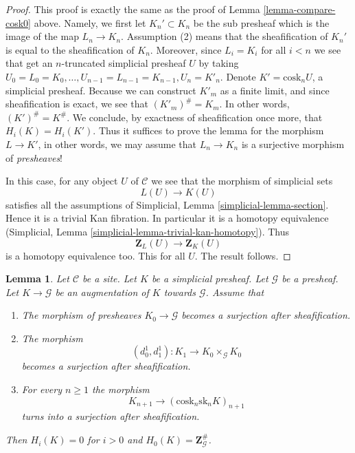 \documentclass{stacks-project}
\theoremstyle{plain}
\newtheorem{lemma}[subsection]{Lemma}
\theoremstyle{definition}
\theoremstyle{remark}
\numberwithin{equation}{subsection}
\begin{document}
\begin{proof}
This proof is exactly the same as the proof of
Lemma \ref{lemma-compare-cosk0} above. Namely,
we first let $K_n' \subset K_n$ be the sub presheaf
which is the image of the map $L_n \to K_n$. Assumption
(2) means that the sheafification of $K_n'$ is equal to
the sheafification of $K_n$. Moreover, since $L_i = K_i$
for all $i < n$ we see that get an $n$-truncated
simplicial presheaf $U$ by taking
$U_0 = L_0 = K_0, \ldots, U_{n - 1} = L_{n - 1} = K_{n - 1}, U_n = K'_n$.
Denote $K' = \text{cosk}_n U$, a simplicial presheaf.
Because we can construct $K'_m$ as a finite limit, and
since sheafification is exact, we see that
$(K'_m)^\# = K_m$. In other words, $(K')^\# = K^\#$.
We conclude, by exactness of sheafification once more,
that $H_i(K) = H_i(K')$. Thus it suffices to prove the lemma
for the morphism $L \to K'$, in other words, we may
assume that $L_n \to K_n$ is a surjective morphism
of {\it presheaves}!

\medskip\noindent
In this case, for any object $U$ of $\mathcal{C}$ we
see that the morphism of simplicial sets
$$
L(U) \longrightarrow K(U)
$$
satisfies all the assumptions of
Simplicial, Lemma \ref{simplicial-lemma-section}.
Hence it is a trivial Kan fibration. In particular it is
a homotopy equivalence
(Simplicial, Lemma \ref{simplicial-lemma-trivial-kan-homotopy}).
Thus
$$
\mathbf{Z}_L(U) \longrightarrow \mathbf{Z}_K(U)
$$
is a homotopy equivalence too. This for all $U$.
The result follows.
\end{proof}

\begin{lemma}
\label{lemma-acyclic-hypercover-sheaves}
Let $\mathcal{C}$ be a site.
Let $K$ be a simplicial presheaf.
Let $\mathcal{G}$ be a presheaf.
Let $K \to \mathcal{G}$ be an augmentation of $K$
towards $\mathcal{G}$. Assume that
\begin{enumerate}
\item The morphism of presheaves $K_0 \to \mathcal{G}$ becomes
a surjection after sheafification.
\item The morphism
$$
(d^1_0, d^1_1) :
K_1
\longrightarrow
K_0 \times_\mathcal{G} K_0
$$
becomes a surjection after sheafification.
\item For every $n \geq 1$ the morphism
$$
K_{n + 1} \longrightarrow (\text{cosk}_n \text{sk}_n K)_{n + 1}
$$
turns into a surjection after sheafification.
\end{enumerate}
Then $H_i(K) = 0$ for $i > 0$ and
$H_0(K) = \mathbf{Z}_\mathcal{G}^\#$.
\end{lemma}
\end{document}
